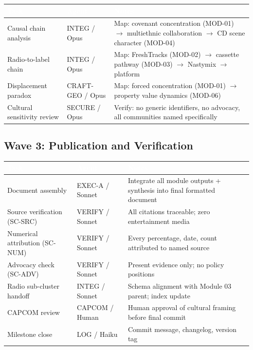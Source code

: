\documentclass[11pt,letterpaper]{article}
\newcommand{\tableheader}[1]{\textbf{\sffamily\textcolor{white}{#1}}}
\begin{document}
\begin{center}
\begin{tabularx}{\textwidth}{L{3.5cm}L{2cm}X}
\toprule
{}
\tableheader{Task} & \tableheader{Agent} & \tableheader{Notes} \\
\midrule
Causal chain analysis & INTEG / Opus & Map: covenant concentration (MOD-01) $\rightarrow$ multiethnic collaboration $\rightarrow$ CD scene character (MOD-04) \\
Radio-to-label chain & INTEG / Opus & Map: FreshTracks (MOD-02) $\rightarrow$ cassette pathway (MOD-03) $\rightarrow$ Nastymix $\rightarrow$ platform \\
Displacement paradox & CRAFT-GEO / Opus & Map: forced concentration (MOD-01) $\rightarrow$ property value dynamics (MOD-06) \\
Cultural sensitivity review & SECURE / Opus & Verify: no generic identifiers, no advocacy, all communities named specifically \\
\bottomrule
\end{tabularx}
\end{center}

\subsection{Wave 3: Publication and Verification}

\begin{center}
\begin{tabularx}{\textwidth}{L{3.5cm}L{2cm}X}
\toprule
{}
\tableheader{Task} & \tableheader{Agent} & \tableheader{Notes} \\
\midrule
Document assembly & EXEC-A / Sonnet & Integrate all module outputs + synthesis into final formatted document \\
Source verification (SC-SRC) & VERIFY / Sonnet & All citations traceable; zero entertainment media \\
Numerical attribution (SC-NUM) & VERIFY / Sonnet & Every percentage, date, count attributed to named source \\
Advocacy check (SC-ADV) & VERIFY / Sonnet & Present evidence only; no policy positions \\
Radio sub-cluster handoff & INTEG / Sonnet & Schema alignment with Module 03 parent; index update \\
CAPCOM review & CAPCOM / Human & Human approval of cultural framing before final commit \\
Milestone close & LOG / Haiku & Commit message, changelog, version tag \\
\bottomrule
\end{tabularx}
\end{center}
\end{document}
